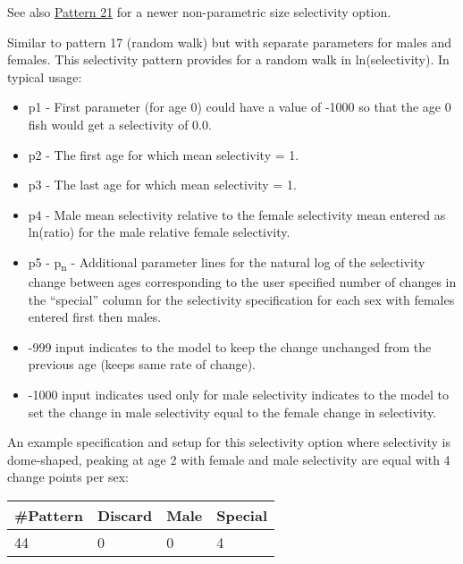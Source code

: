 See also \hyperlink{NonParamSelectivity21}{Pattern 21} for a newer non-parametric size selectivity option.

\hypertarget{Pattern44}{}
Similar to pattern 17 (random walk) but with separate parameters for males and females. This selectivity pattern provides for a random walk in ln(selectivity). In typical usage:
	\begin{itemize}
		\item p1 - First parameter (for age 0) could have a value of -1000 so that the age 0 fish would get a selectivity of 0.0.
		\item p2 - The first age for which mean selectivity = 1.
		\item p3 - The last age for which mean selectivity = 1.
		\item p4 - Male mean selectivity relative to the female selectivity mean entered as ln(ratio) for the male relative female selectivity.
		\item p5 - p\textsubscript{n} - Additional parameter lines for the natural log of the selectivity change between ages corresponding to the user specified number of changes in the ``special'' column for the selectivity specification for each sex with females entered first then males.
		\item -999 input indicates to the model to keep the change unchanged from the previous age (keeps same rate of change).
		\item -1000 input indicates used only for male selectivity indicates to the model to set the change in male selectivity equal to the female change in selectivity.
	\end{itemize}
	
An example specification and setup for this selectivity option where selectivity is dome-shaped, peaking at age 2 with female and male selectivity are equal with 4 change points per sex:
	\begin{center}
		\begin{longtable}{p{1.5cm} p{1.5cm} p{1.5cm} p{1.5cm}}
			\hline
			\#Pattern & Discard & Male & Special \Tstrut\Bstrut\\
			\hline
			44 & 0 & 0 & 4 \Tstrut\Bstrut\\
			\hline
		\end{longtable}
	\end{center}

